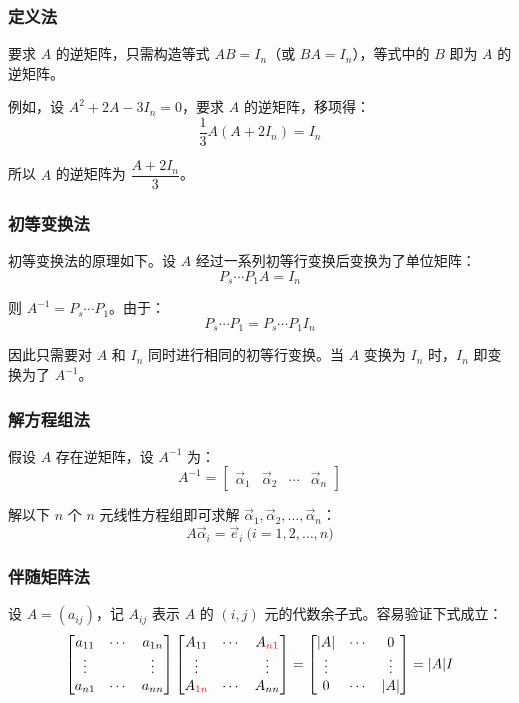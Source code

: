 \subsubsection{定义法}

要求 $A$ 的逆矩阵，只需构造等式 $AB = I_n$（或 $BA = I_n$），等式中的 $B$ 即为 $A$ 的逆矩阵。

例如，设 $A^2 + 2A - 3I_n = 0$，要求 $A$ 的逆矩阵，移项得：
$$
\dfrac{1}{3} A(A + 2 I_n) = I_n
$$

所以 $A$ 的逆矩阵为 $\dfrac{A + 2 I_n}{3}$。

\subsubsection{初等变换法}

初等变换法的原理如下。设 $A$ 经过一系列初等行变换后变换为了单位矩阵：
$$
P_s \cdots P_1 A = I_n
$$

则 $A^{-1} = P_s \cdots P_1$。由于：
$$
P_s \cdots P_1 = P_s \cdots P_1 I_n
$$

因此只需要对 $A$ 和 $I_n$ 同时进行相同的初等行变换。当 $A$ 变换为 $I_n$ 时，$I_n$ 即变换为了 $A^{-1}$。

\subsubsection{解方程组法}

假设 $A$ 存在逆矩阵，设 $A^{-1}$ 为：
$$
A^{-1} =
\begin{bmatrix}
	\vec \alpha_1 & \vec \alpha_2 & \cdots & \vec \alpha_n
\end{bmatrix}
$$

解以下 $n$ 个 $n$ 元线性方程组即可求解 $\vec \alpha_1, \vec \alpha_2, \ldots, \vec \alpha_n$：
$$
A \vec \alpha_i = \vec e_i \pod{i = 1, 2, \ldots, n}
$$

\subsubsection{伴随矩阵法}

设 $A = (a_{ij})$，记 $A_{ij}$ 表示 $A$ 的 $(i, j)$ 元的代数余子式。容易验证下式成立：
$$
\begin{bmatrix}
	a_{11} & \cdots & a_{1n}
	\\
	\vdots & & \vdots
	\\
	a_{n1} & \cdots & a_{nn}
\end{bmatrix}
\begin{bmatrix}
	A_{11} & \cdots & A_{\textcolor{red}{n1}}
	\\
	\vdots & & \vdots
	\\
	A_{\textcolor{red}{1n}} & \cdots & A_{nn}
\end{bmatrix}
=
\begin{bmatrix}
	|A| & \cdots & 0
	\\
	\vdots & & \vdots
	\\
	0 & \cdots & |A|
\end{bmatrix} = |A|I
$$

